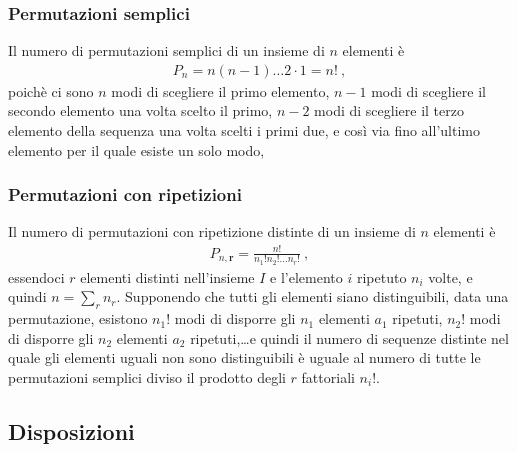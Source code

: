 \documentclass[letterpaper,10pt,italian]{jupyterBook}
\begin{document}
\subsubsection{Permutazioni semplici}
\label{\detokenize{ch/statistics/combinatorics:permutazioni-semplici}}
\sphinxAtStartPar
Il numero di permutazioni semplici di un insieme di \(n\) elementi è
\begin{equation*}
\begin{split}P_n = n (n-1) \dots 2 \cdot 1 = n! \ ,\end{split}
\end{equation*}
\sphinxAtStartPar
poichè ci sono \(n\) modi di scegliere il primo elemento, \(n-1\) modi di scegliere il secondo elemento una volta scelto il primo, \(n-2\) modi di scegliere il terzo elemento della sequenza una volta scelti i primi due, e così via fino all’ultimo elemento per il quale esiste un solo modo,


\subsubsection{Permutazioni con ripetizioni}
\label{\detokenize{ch/statistics/combinatorics:permutazioni-con-ripetizioni}}
\sphinxAtStartPar
Il numero di permutazioni con ripetizione distinte di un insieme di \(n\) elementi è
\begin{equation*}
\begin{split}P_{n, \mathbf{r}} = \frac{n!}{n_1! n_2! \dots n_r!} \ ,\end{split}
\end{equation*}
\sphinxAtStartPar
essendoci \(r\) elementi distinti nell’insieme \(I\) e l’elemento \(i\) ripetuto \(n_i\) volte, e quindi \(n = \sum_{r} n_r\). Supponendo che tutti gli elementi siano distinguibili, data una permutazione, esistono \(n_1!\) modi di disporre gli \(n_1\) elementi \(a_1\) ripetuti, \(n_2!\) modi di disporre gli \(n_2\) elementi \(a_2\) ripetuti,…e quindi il numero di sequenze distinte nel quale gli elementi uguali non sono distinguibili è uguale al numero di tutte le permutazioni semplici diviso il prodotto degli \(r\) fattoriali \(n_i!\).


\subsection{Disposizioni}
\label{\detokenize{ch/statistics/combinatorics:disposizioni}}
\end{document}
